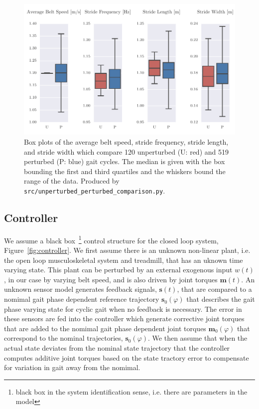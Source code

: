 \documentclass{article}
\begin{document}
\begin{figure}
  \centering
  \includegraphics{figures/unperturbed-perturbed-boxplot-comparison.pdf}
  \cprotect\caption{Box plots of the average belt speed, stride frequency,
    stride length, and stride width which compare 120 unperturbed (U: red) and
    519 perturbed (P: blue) gait cycles. The median is given with the box
    bounding the first and third quartiles and the whiskers bound the range of
    the data. Produced by \verb|src/unperturbed_perturbed_comparison.py|.}
  \label{fig:gait-cycle-stats-comparison}
\end{figure}

\subsection*{Controller}
\label{sec:controller}
%
We assume a black box~\footnote{black box in the system identification sense,
i.e. there are parameters in the model} control structure for the closed loop
system, Figure~\ref{fig:controller}. We first assume there is an unknown
non-linear plant, i.e. the open loop musculoskeletal system and treadmill, that
has an uknown time varying state. This plant can be perturbed by an external
exogenous input $w(t)$, in our case by varying belt speed, and is also driven
by joint torques $\mathbf{m}(t)$. An unknown sensor model generates feedback
signals, $\mathbf{s}(t)$, that are compared to a nomimal gait phase dependent
reference trajectory $\mathbf{s}_0(\varphi)$ that describes the gait phase
varying state for cyclic gait when no feedback is necessary. The error in these
sensors are fed into the controller which generate corrective joint torques
that are added to the nomimal gait phase dependent joint torques
$\mathbf{m}_0(\varphi)$ that correspond to the nominal trajectories,
$\mathbf{s}_0(\varphi)$. We then assume that when the actual state deviates
from the nominal state trajectory that the controller computes additive joint
torques based on the state tractory error to compensate for variation in gait
away from the nomimal.
\end{document}
